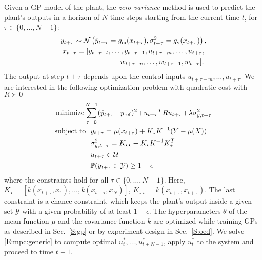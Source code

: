 Given a GP model of the plant, the \emph{zero-variance} method is used to predict the plant's outputs in a horizon of $N$ time steps starting from the current time $t$, for \(\tau \in \{0,\dots,N-1\}\):
\begin{gather}
  \label{eq:dpc:prediction}
y_{t+\tau} \sim \GaussianDist{\bar{y}_{t+\tau} = g_{\mathrm m}(x_{t+\tau})}{\sigma^2_{t+\tau} = g_{\mathrm v}(x_{t+\tau})}, \\
x_{t + \tau} = [\bar y_{t+ \tau-l}, \dots, \bar y_{t+ \tau-1}, u_{t+ \tau-m}, \dots, u_{t+ \tau}, \nonumber \\
\qquad\qquad\qquad\qquad  w_{t+ \tau-p}, \dots, w_{t+ \tau-1}, w_{t+ \tau}]\text. \nonumber
\end{gather}
The output at step \(t+\tau\) depends upon %
the control inputs \(u_{t+\tau-m}, \dots, u_{t+\tau}\).
We are interested in the following optimization problem with quadratic cost with \(R \succ 0\)
\begin{align}
  &\minimize \sum_{\tau=0}^{N-1} (\bar{y}_{t+\tau}\!-\!y_{\mathrm{ref}})^2 \!+\! {u_{t+\tau}}^T R {u_{t+\tau}} \!+\! \lambda \sigma^2_{y,t+\tau} \label{E:mpc:generic} \\
  & 
    \begin{aligned}
      \st\ \  & \bar{y}_{t+\tau} = \mu(x_{t+\tau}) + K_\star K^{-1} (Y - \mu(X)) \nonumber\\
      & \sigma^2_{y,t+\tau} = K_{\star \star} - K_\star K^{-1} K_\star^T \\
      & u_{t+\tau} \in \mathcal{U} \nonumber \\
      & \mathbb{P}(y_{t+\tau} \in \mathcal{Y}) \geq 1 - \epsilon \nonumber
    \end{aligned}
\end{align}
where the constraints hold for all \(\tau \in \{0,\dots,N-1\}\).
Here, \(K_\star = [k(x_{t+\tau}, x_1), \dots, k(x_{t+\tau}, x_N)]\), \(K_{\star \star} = k(x_{t+\tau}, x_{t+\tau})\). %
The last constraint is a chance constraint, which keeps the plant's output inside a given set $\mathcal{Y}$ with a given probability of at least $1 - \epsilon$.
The hyperparameters \(\theta\) of the mean function \(\mu\) and the covariance function \(k\) are optimized while training GPs as described in Sec.~\ref{S:gp} or by experiment design in Sec.~\ref{S:oed}.
We solve \eqref{E:mpc:generic} to compute optimal \(u_{t}^*, \dots, u_{t+N-1}^*\), apply \(u_{t}^*\) to the system and proceed to time \(t+1\).

